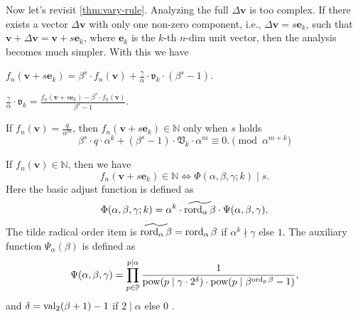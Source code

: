 Now let's revisit \cref{thm:vary-rule}. Analyzing the full $\Delta\bm{v}$ is too complex. If there exists a vector $\Delta\bm{v}$ with only one non-zero component, i.e., $\Delta{\bm{v}} = s\bm{e}_{k}$, such that $\bm{v} + \Delta\bm{v} = \bm{v}+s\bm{e}_{k}$, where $\bm{e}_k$ is the $k$-th $n$-dim unit vector, then the analysis becomes much simpler. With this we have
\begin{corollary}\label{cor:single-vary-rule}
$f_{n}(\bm{v}+s\bm{e}_{k}) = \beta^{s}\cdot f_{n}(\bm{v}) + \frac{\gamma}{\alpha}\cdot\mathfrak{v}_{k}\cdot(\beta^{s} - 1)$.
\end{corollary}
\begin{corollary}
$\frac{\gamma}{\alpha}\cdot\mathfrak{v}_{k} = \frac{f_{n}(\bm{v}+s\bm{e}_{k}) - \beta^{s}\cdot f_{n}(\bm{v})}{\beta^{s} - 1}$.
\end{corollary}
\begin{corollary}
    If $f_{n}(\bm{v}) = \frac{q}{\alpha^{m}}$, then $f_{n}(\bm{v}+s\bm{e}_{k}) \in \mathbb{N}$ only when $s$ holds
    \[ \beta^{s}\cdot q\cdot \alpha^{k} + (\beta^{s} - 1) \cdot \mathfrak{V}_{k}\cdot \alpha^{m} \equiv 0. \pmod{\alpha^{m+k}} \]
\end{corollary}
\begin{theorem}\label{thm:the-periodic-rule-of-reduce-sequence}
    If $f_{n}(\bm{v}) \in \mathbb{N}$, then we have
    \[f_{n}(\bm{v}+s\bm{e}_{k}) \in \mathbb{N}\Longleftrightarrow \Phi(\alpha,\beta,\gamma; k) \mid s. \]
    Here the basic adjust function is defined as
    \[ \Phi(\alpha, \beta, \gamma; k) = \alpha^{k}\cdot \widetilde{\operatorname{rord}_{\alpha}\beta}\cdot\Psi(\alpha,\beta,\gamma). \]
    The tilde radical order item is $\widetilde{\operatorname{rord}_{\alpha}\beta} = \operatorname{rord}_{\alpha}\beta$ if $\alpha^{k} \nmid \gamma$ else $1$.
    The auxiliary function $\Psi_{\alpha}(\beta)$ is defined as
    \[ \Psi(\alpha,\beta,\gamma) = \prod_{p\in\mathbb{P}}^{p \mid \alpha}\frac{1}{\operatorname{pow}(p\mid\gamma\cdot2^{\delta})\cdot\operatorname{pow}(p\mid\beta^{\operatorname{ord}_{p}\beta} - 1)},
    \]
    and $\delta = \operatorname{val}_2(\beta + 1) - 1$ if $2 \mid \alpha$ else $0$ .
\end{theorem}
